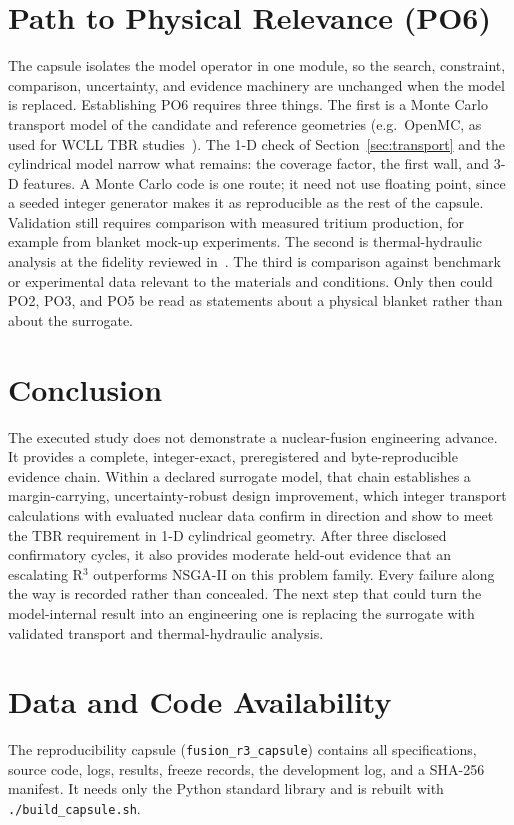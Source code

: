 \documentclass[11pt]{article}
\begin{document}
\section{Path to Physical Relevance (PO6)}

The capsule isolates the model operator in one module, so the search, constraint, comparison,
uncertainty, and evidence machinery are unchanged when the model is replaced. Establishing PO6
requires three things. The first is a Monte Carlo transport model of the candidate and reference geometries
(e.g.\ OpenMC, as used for WCLL TBR studies~\cite{Chiletti2026}). The 1-D check of Section~\ref{sec:transport}
and the cylindrical model narrow what remains: the coverage factor, the first wall, and 3-D features. A
Monte Carlo code is one route; it need not use floating point, since a seeded integer generator makes it as
reproducible as the rest of the capsule. Validation still requires comparison with measured tritium production,
for example from blanket mock-up experiments. The second is thermal-hydraulic
analysis at the fidelity reviewed in~\cite{Seo2021}. The third is comparison against benchmark or experimental data
relevant to the materials and conditions. Only then could PO2, PO3, and PO5 be read as statements about a
physical blanket rather than about the surrogate.

\section{Conclusion}

The executed study does not demonstrate a nuclear-fusion engineering advance. It provides a
complete, integer-exact, preregistered and byte-reproducible evidence chain. Within a declared surrogate
model, that chain establishes a margin-carrying, uncertainty-robust design improvement, which integer transport calculations with evaluated nuclear data confirm in
direction and show to meet the TBR requirement in 1-D cylindrical geometry. After three
disclosed confirmatory cycles, it also provides moderate held-out evidence that an escalating R$^3$
outperforms NSGA-II on this problem family. Every failure along the way is recorded rather than
concealed. The next step that could
turn the model-internal result into an engineering one is replacing the surrogate with validated
transport and thermal-hydraulic analysis.

\section*{Data and Code Availability}
The reproducibility capsule (\texttt{fusion\_r3\_capsule}) contains all specifications, source
code, logs, results, freeze records, the development log, and a SHA-256 manifest. It needs only the
Python standard library and is rebuilt with \texttt{./build\_capsule.sh}.
\end{document}
